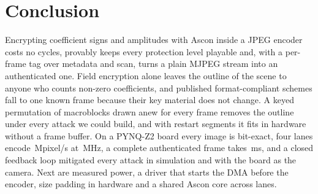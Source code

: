 \section{Conclusion}\label{sec:conclusion}
Encrypting coefficient signs and amplitudes with Ascon inside a JPEG encoder costs no cycles, provably keeps every protection level playable and, with a per-frame tag over metadata and scan, turns a plain MJPEG stream into an authenticated one. Field encryption alone leaves the outline of the scene to anyone who counts non-zero coefficients, and published format-compliant schemes fall to one known frame because their key material does not change. A keyed permutation of macroblocks drawn anew for every frame removes the outline under every attack we could build, and with restart segments it fits in hardware without a frame buffer. On a PYNQ-Z2 board every image is bit-exact, four lanes encode \BdFourBusyMpix\,Mpixel/s at \BdFourMhz\,MHz, a complete authenticated frame takes \BdFourZcMs\,ms, and a closed feedback loop mitigated every attack in simulation and with the board as the camera. Next are measured power, a driver that starts the DMA before the encoder, size padding in hardware and a shared Ascon core across lanes.
